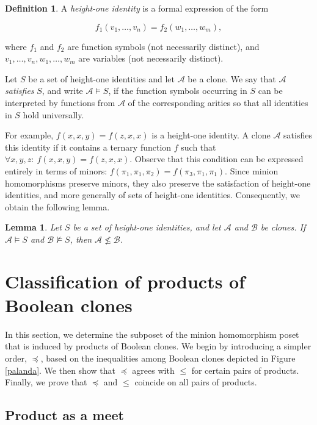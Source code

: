 \documentclass{amsart}
\numberwithin{equation}{section}
\theoremstyle{plain}
\newtheorem{lemma}[theorem]{Lemma}
\theoremstyle{definition}
\newtheorem{definition}[theorem]{Definition}
\def\clone#1{\mathcal{#1}}
\begin{document}
\begin{definition}
A {\em height-one identity} is a formal expression of the form

$$f_1(v_1,\dots,v_n)=f_2(w_1,\dots,w_m),$$

where $f_1$ and $f_2$ are function symbols (not necessarily distinct),
and $v_1,\dots,v_n,w_1,\dots,w_m$ are variables (not necessarily distinct).

Let $S$ be a set of height-one identities and let $\clone{A}$ be a clone.
We say that $\clone{A}$ {\em satisfies} $S$, and write
$\clone{A}\models S$, if the function symbols occurring in $S$ can be
interpreted by functions from $\clone{A}$ of the corresponding arities
so that all identities in $S$ hold universally.
\end{definition}

For example,
$f(x,x,y)=f(z,x,x)$
is a height-one identity. A clone $\clone{A}$ satisfies this identity if it
contains a ternary function $f$ such that
$\forall x,y,z\colon\ f(x,x,y)=f(z,x,x)$.
Observe that this condition can be expressed entirely in terms of minors:
$f(\pi_1,\pi_1,\pi_2)=f(\pi_3,\pi_1,\pi_1)$.
Since minion homomorphisms preserve minors, they also preserve the satisfaction
of height-one identities, and more generally of sets of height-one
identities. Consequently, we obtain the following lemma.

\begin{lemma}\label{identity-proof-strategy}
Let $S$ be a set of height-one identities, and let $\clone{A}$ and
$\clone{B}$ be clones. If
$\clone{A}\models S$
and
$\clone{B}\not\models S$,
then
$\clone{A}\not\leq \clone{B}$.
\end{lemma}

\section{Classification of products of Boolean clones}

In this section, we determine the subposet of the minion homomorphism poset that is
induced by products of Boolean clones. 
We begin by introducing a simpler order, $\preceq$, based on the inequalities among Boolean clones depicted in Figure \ref{palanda}. We then show that $\preceq$ agrees with $\leq$ for certain pairs of products. Finally, we prove that $\preceq$ and $\leq$ coincide on all pairs of products.

\subsection{Product as a meet}
\end{document}
